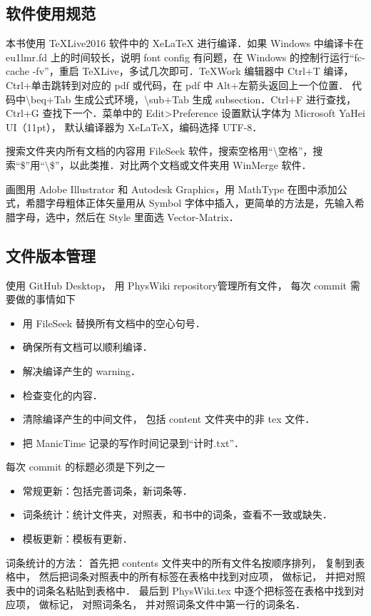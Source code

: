 

\subsection{软件使用规范}

本书使用 TeXLive2016 软件中的 XeLaTeX 进行编译．如果 Windows 中编译卡在 eu1lmr.fd 上的时间较长，说明 font config 有问题，在 Windows 的控制行运行“fc-cache -fv”，重启 TeXLive，多试几次即可．TeXWork 编辑器中 Ctrl+T 编译，Ctrl+单击跳转到对应的 pdf 或代码，在 pdf 中 Alt+左箭头返回上一个位置． 代码中\textbackslash beq+Tab 生成公式环境，\textbackslash sub+Tab 生成 subsection．Ctrl+F 进行查找，Ctrl+G 查找下一个．菜单中的 Edit>Preference 设置默认字体为 Microsoft YaHei UI（11pt）， 默认编译器为 XeLaTeX，编码选择 UTF-8．

搜索文件夹内所有文档的内容用 FileSeek 软件，搜索空格用“\textbackslash 空格”，搜索“\$”用“\textbackslash \$”，以此类推．对比两个文档或文件夹用 WinMerge 软件．

画图用 Adobe Illustrator 和 Autodesk Graphics，用 MathType 在图中添加公式，希腊字母粗体正体矢量用从 Symbol 字体中插入，更简单的方法是，先输入希腊字母，选中，然后在 Style 里面选 Vector-Matrix．

\subsection{文件版本管理}
使用 GitHub Desktop， 用 PhysWiki repository管理所有文件， 每次 commit 需要做的事情如下
\begin{itemize}
\item 用 FileSeek 替换所有文档中的空心句号．
\item 确保所有文档可以顺利编译．
\item 解决编译产生的 warning．
\item 检查变化的内容．
\item 清除编译产生的中间文件， 包括 content 文件夹中的非 tex 文件．
\item 把 ManicTime 记录的写作时间记录到“计时.txt”．
\end{itemize}
每次 commit 的标题必须是下列之一
\begin{itemize}
\item 常规更新：包括完善词条，新词条等．
\item 词条统计：统计文件夹，对照表，和书中的词条，查看不一致或缺失．
\item 模板更新：模板有更新．
\end{itemize}
词条统计的方法： 首先把 contents 文件夹中的所有文件名按顺序排列， 复制到表格中， 然后把词条对照表中的所有标签在表格中找到对应项， 做标记， 并把对照表中的词条名粘贴到表格中． 最后到 PhysWiki.tex 中逐个把标签在表格中找到对应项， 做标记， 对照词条名， 并对照词条文件中第一行的词条名．

